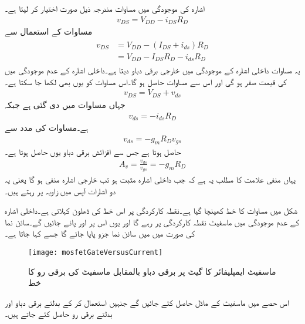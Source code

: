 اشارہ  کی موجودگی میں مساوات   مندرجہ ذیل صورت اختیار کر لیتا ہے۔
\begin{align}
v_{DS}=V_{DD}-i_{DS}R_D
\end{align}
مساوات   کے استعمال سے 
\begin{gather}
\begin{aligned}
v_{DS}&=V_{DD}-\left(I_{DS}+i_{ds} \right )R_D\\
&=V_{DD}-I_{DS}R_D-i_{ds}R_D
\end{aligned}
\end{gather}
یہ مساوات داخلی اشارہ کے موجودگی میں خارجی برقی دباو دیتا ہے۔داخلی اشارہ کے عدم موجودگی میں  کی قیمت صفر ہو گی اور اس سے مساوات  حاصل ہو گا۔اس مساوات کو یوں بھی لکھا جا سکتا ہے۔
\begin{align}
v_{DS}=V_{DS}+v_{ds}
\end{align}
جہاں   مساوات   میں دی گئی ہے جبکہ 
\begin{align}
v_{ds}=-i_{ds} R_D
\end{align}
ہے۔مساوات   کی مدد سے
\begin{align}
v_{ds}=-g_m R_D v_{gs}
\end{align}
حاصل ہوتا ہے جس سے افزائش برقی دباو یوں حاصل ہوتا ہے۔
\begin{align}\label{مساوات_ماسفیٹ_افزائش_کی_سادہ_مساوات}
A_v=\frac{v_{ds}}{v_{gs}}=-g_m R_D
\end{align}
یہاں منفی علامت کا مطلب یہ ہے کہ جب داخلی اشارہ   مثبت ہو تب خارجی اشارہ   منفی ہو گا یعنی یہ دو اشارات آپس میں   زاویہ پر رہتے ہیں۔

شکل  میں  مساوات  کا خط کھینچا گیا ہے۔نقطہ  کارکردگی پر اس خط کی ڈھلون  کہلاتی ہے۔داخلی اشارہ  کے عدم موجودگی میں ماسفیٹ نقطہ کارکردگی  پر رہے گا اور یوں اس پر  اور  پائے جائیں گے۔سائن نما  کی صورت میں  میں سائن نما جزو پایا جائے گا جسے  کہا جاتا ہے۔
\begin{figure}
\centering
\texttt{[image: mosfetGateVersusCurrent]}
\caption{ماسفیٹ ایمپلیفائر کا گیٹ پر برقی دباو بالمقابل ماسفیٹ کی برقی رو کا خط}
\label{شکل_ماسفیٹ_ایمپلیفائر_گیٹ_دباو_بالمقابل_برقی_رو}
\end{figure}
اس حصے میں ماسفیٹ کے ماڈل حاصل کئے جائیں گے جنہیں استعمال کر کے بدلتے برقی دباو اور بدلتے برقی رو حاصل کئے جاتے ہیں۔

